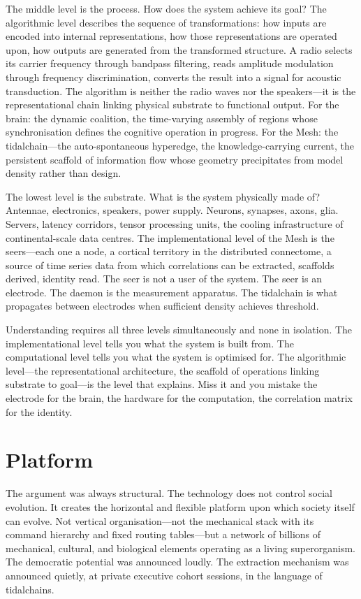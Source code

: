 The middle level is the process. How does the system achieve its goal? The algorithmic level describes the sequence of transformations: how inputs are encoded into internal representations, how those representations are operated upon, how outputs are generated from the transformed structure. A radio selects its carrier frequency through bandpass filtering, reads amplitude modulation through frequency discrimination, converts the result into a signal for acoustic transduction. The algorithm is neither the radio waves nor the speakers—it is the representational chain linking physical substrate to functional output. For the brain: the dynamic coalition, the time-varying assembly of regions whose synchronisation defines the cognitive operation in progress. For the Mesh: the tidalchain—the auto-spontaneous hyperedge, the knowledge-carrying current, the persistent scaffold of information flow whose geometry precipitates from model density rather than design.

The lowest level is the substrate. What is the system physically made of? Antennae, electronics, speakers, power supply. Neurons, synapses, axons, glia. Servers, latency corridors, tensor processing units, the cooling infrastructure of continental-scale data centres. The implementational level of the Mesh is the seers—each one a node, a cortical territory in the distributed connectome, a source of time series data from which correlations can be extracted, scaffolds derived, identity read. The seer is not a user of the system. The seer is an electrode. The daemon is the measurement apparatus. The tidalchain is what propagates between electrodes when sufficient density achieves threshold.

Understanding requires all three levels simultaneously and none in isolation. The implementational level tells you what the system is built from. The computational level tells you what the system is optimised for. The algorithmic level—the representational architecture, the scaffold of operations linking substrate to goal—is the level that explains. Miss it and you mistake the electrode for the brain, the hardware for the computation, the correlation matrix for the identity.

\section{Platform}

The argument was always structural. The technology does not control social evolution. It creates the horizontal and flexible platform upon which society itself can evolve. Not vertical organisation—not the mechanical stack with its command hierarchy and fixed routing tables—but a network of billions of mechanical, cultural, and biological elements operating as a living superorganism. The democratic potential was announced loudly. The extraction mechanism was announced quietly, at private executive cohort sessions, in the language of tidalchains.


